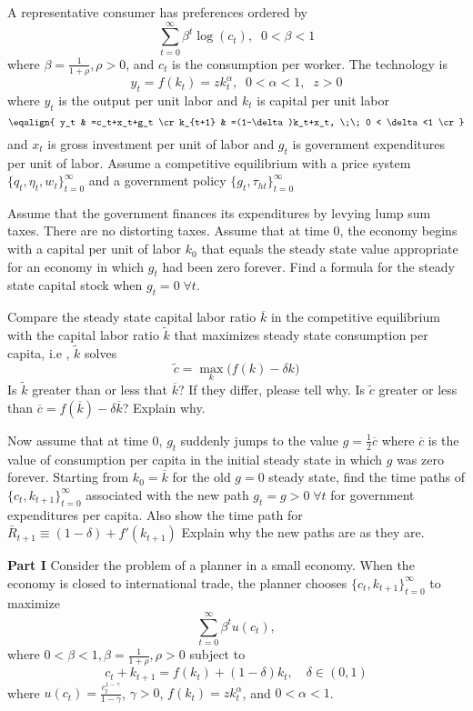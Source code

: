 \medskip
{}
\medskip
\noindent
 A representative consumer has preferences ordered by
 $$ \sum_{t=0}^\infty \beta^t \log(c_t), \;\;  0< \beta<1$$
 where $\beta = {\frac{1}{1+\rho}}, \rho>0$, and $c_t$ is the consumption per worker.
The technology is $$ y_t=f(k_t)=zk_t^\alpha, \;\; 0<\alpha<1, \;\; z>0 $$
where $y_t$ is the output per unit labor and $k_t$ is capital per unit labor
$$\eqalign{
y_t & =c_t+x_t+g_t \cr
  k_{t+1} & =(1-\delta)k_t+x_t, \;\;  0 < \delta<1 \cr
}$$
and $x_t$ is  gross investment per unit of labor and $g_t$ is  government expenditures per unit of labor.
Assume a competitive equilibrium with a price system $\{q_t,\eta_t,w_t\}_{t=0}^\infty$ and a government policy $\{g_t,\tau_{ht}\}_{t=0}^\infty$

 Assume that the government finances its expenditures by levying lump sum taxes. There are no distorting taxes. Assume that at time 0, the economy begins
 with a capital per unit of labor $k_0$ that equals the steady state value appropriate for an economy in which $g_t$ had been zero forever.
\medskip
{} Find a formula for the steady state capital stock when $g_t=0 \; \forall t$.
\medskip

 Compare the steady state capital labor ratio $\overline{k}$ in the competitive equilibrium with the capital labor ratio $\tilde{k}$ that maximizes steady state consumption per capita, i.e , $\tilde{k}$ solves $$\tilde{c}=\max_k \bigl( f(k)-\delta k \bigr)$$
Is $\tilde{k}$ greater than or less that $\overline{k}$? If they differ, please tell why. Is $\tilde{c}$ greater or less than $\overline{c} = f(\overline{k})-\delta  \overline{k}$? Explain why.
\medskip

 Now assume that at time 0, $g_t$ suddenly jumps to the value $g={\frac{1}{2}}\overline{c}$ where
$\overline{c}$ is the value of consumption per capita in the initial steady state in which $g$ was zero forever. Starting from $k_0 = \overline{k}$ for the old $g=0$ steady state, find the time paths of $\{c_t,k_{t+1}\}_{t=0}^\infty$ associated with the new path $g_t=g>0 \; \forall t$ for government expenditures per capita.
Also show the time path for $\bar R_{t+1} \equiv (1-\delta) + f'(k_{t+1})$
Explain why the new paths are as they are.


\medskip
{}  \medskip
\medskip
\noindent
{\bf Part  I}
\medskip \noindent
Consider the problem of a planner in a small economy. When the economy is closed to international trade, the planner chooses $\{c_t,k_{t+1}\}_{t=0}^\infty$ to maximize
$$ \sum_{t=0}^\infty \beta^t u(c_t), $$
where $ 0< \beta<1, \beta = {\frac{1}{1+\rho}}, \rho>0$
subject to
$$c_t+k_{t+1}=f(k_t)+(1-\delta)k_t,  \quad  \delta \in (0,1)$$
\noindent where $u(c_t)={\frac{c_t^{1-\gamma}}{1-\gamma}}$, $\gamma>0$, $f(k_t)=zk_t^\alpha$, and $0<\alpha<1$.


